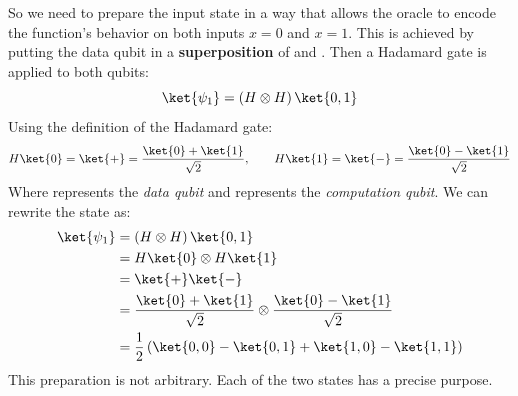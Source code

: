 \highspace
\textcolor{Green3}{} So we need to prepare the input state in a way that allows the oracle to encode the function's behavior on both inputs $x=0$ and $x=1$. This is achieved by putting the data qubit in a \textbf{superposition} of  and . Then a Hadamard gate is applied to both qubits:
\begin{equation*}
    \ket{\psi_1} = \left(H \otimes H\right) \ket{0, 1}
\end{equation*}
Using the definition of the Hadamard gate:
\begin{equation*}
    H\ket{0} = \ket{+} = \frac{\ket{0} + \ket{1}}{\sqrt{2}}, \qquad H\ket{1} = \ket{-} = \frac{\ket{0} - \ket{1}}{\sqrt{2}}
\end{equation*}
Where \ket{+} represents the \emph{data qubit} and \ket{-} represents the \emph{computation qubit}. We can rewrite the state  as:
\begin{align*}
    \ket{\psi_1} &= \left(H \otimes H\right) \ket{0, 1} \\
    &= H\ket{0} \otimes H\ket{1} \\
    &= \ket{+}\ket{-} \\
    &= \frac{\ket{0} + \ket{1}}{\sqrt{2}} \otimes \frac{\ket{0} - \ket{1}}{\sqrt{2}} \\
    &= \frac{1}{2} \left(\ket{0, 0} - \ket{0, 1} + \ket{1, 0} - \ket{1, 1}\right)
\end{align*}
This preparation is not arbitrary. Each of the two states has a precise purpose.

\newpage

